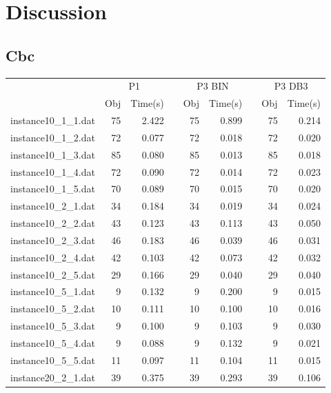 \chapter{Discussion}


\section{Cbc}

\begin{table}[h!]\centering
{}
\begin{tabular}{@{}rrrcrrcrr@{}}\toprule
& \multicolumn{2}{c}{P1} & \phantom{abc} & \multicolumn{2}{c}{P3 BIN} & \phantom{abc} & \multicolumn{2}{c}{P3 DB3}\\
\cmidrule{2-3} \cmidrule{5-6} \cmidrule{8-9}
& Obj & Time(s) & & Obj & Time(s) & & Obj & Time(s)\\ \midrule
instance10\_1\_1.dat & 75 & 2.422 & & 75 & 0.899 & & 75 & 0.214 \\
instance10\_1\_2.dat & 72 & 0.077 & & 72 & 0.018 & & 72 & 0.020 \\
instance10\_1\_3.dat & 85 & 0.080 & & 85 & 0.013 & & 85 & 0.018 \\
instance10\_1\_4.dat & 72 & 0.090 & & 72 & 0.014 & & 72 & 0.023 \\
instance10\_1\_5.dat & 70 & 0.089 & & 70 & 0.015 & & 70 & 0.020 \\
instance10\_2\_1.dat & 34 & 0.184 & & 34 & 0.019 & & 34 & 0.024 \\
instance10\_2\_2.dat & 43 & 0.123 & & 43 & 0.113 & & 43 & 0.050 \\
instance10\_2\_3.dat & 46 & 0.183 & & 46 & 0.039 & & 46 & 0.031 \\
instance10\_2\_4.dat & 42 & 0.103 & & 42 & 0.073 & & 42 & 0.032 \\
instance10\_2\_5.dat & 29 & 0.166 & & 29 & 0.040 & & 29 & 0.040 \\
instance10\_5\_1.dat & 9 & 0.132 & & 9 & 0.200 & & 9 & 0.015 \\
instance10\_5\_2.dat & 10 & 0.111 & & 10 & 0.100 & & 10 & 0.016 \\
instance10\_5\_3.dat & 9 & 0.100 & & 9 & 0.103 & & 9 & 0.030 \\
instance10\_5\_4.dat & 9 & 0.088 & & 9 & 0.132 & & 9 & 0.021 \\
instance10\_5\_5.dat & 11 & 0.097 & & 11 & 0.104 & & 11 & 0.015 \\
instance20\_2\_1.dat & 39 & 0.375 & & 39 & 0.293 & & 39 & 0.106 \\

\end{tabular}
\end{table}
